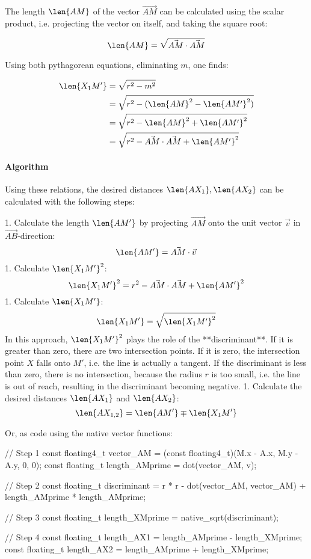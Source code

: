 The length $\len{AM}$ of the vector $\vec{AM}$ can be calculated using the scalar product, i.e. projecting the vector on itself, and taking the square root:

\begin{equation} \len{AM} = \sqrt{\vec{AM} \cdot \vec{AM}} \end{equation}

Using both pythagorean equations, eliminating $m$, one finds:

\begin{equation}\begin{split}
  \len{X_1 M'} &= \sqrt{r^2 - m^2} \\
    &= \sqrt{r^2 - (\len{AM}^2 - \len{AM'}^2)} \\
    &= \sqrt{r^2 - \len{AM}^2 + \len{AM'}^2} \\
    &= \sqrt{r^2 - \vec{AM} \cdot \vec{AM} + \len{AM'}^2}
\end{split}\end{equation}

\paragraph{Algorithm} Using these relations, the desired distances $\len{AX_1}, \len{AX_2}$ can be calculated with the following steps:

1. Calculate the length $\len{AM'}$ by projecting $\vec{AM}$ onto the unit vector $\vec{v}$ in $\vec{AB}$-direction: $$ \len{AM'} = \vec{AM} \cdot \vec{v} $$
1. Calculate $\len{X_1M'}^2$: $$ \len{X_1 M'}^2 = r^2 - \vec{AM} \cdot \vec{AM} + \len{AM'}^2 $$
1. Calculate $\len{X_1M'}$: $$ \len{X_1 M'} = \sqrt{\len{X_1 M'}^2} $$ In this approach, $\len{X_1M'}^2$ plays the role of the **discriminant**. If it is greater than zero, there are two intersection points. If it is zero, the intersection point $X$ falls onto $M'$, i.e. the line is actually a tangent. If the discriminant is less than zero, there is no intersection, because the radius $r$ is too small, i.e. the line is out of reach, resulting in the discriminant becoming negative.
1. Calculate the desired distances $\len{AX_1}$ and $\len{AX_2}$: $$ \len{A X_{1,2}} = \len{A M'} \mp \len{X_1 M'} $$

Or, as  code using the  native vector functions:

\begin{ccode}
  // Step 1
  const floating4_t vector_AM = (const floating4_t)(M.x - A.x, M.y - A.y, 0, 0);
  const floating_t length_AMprime = dot(vector_AM, v);

  // Step 2
  const floating_t discriminant = r * r - dot(vector_AM, vector_AM) + length_AMprime * length_AMprime;

  // Step 3
  const floating_t length_XMprime = native_sqrt(discriminant);

  // Step 4
  const floating_t length_AX1 = length_AMprime - length_XMprime;
  const floating_t length_AX2 = length_AMprime + length_XMprime;
\end{ccode}


